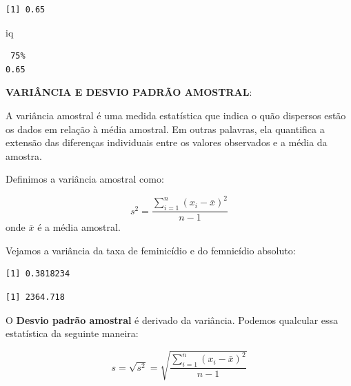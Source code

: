 \documentclass[
  letterpaper,
  DIV=11,
  numbers=noendperiod]{scrreprt}
\newenvironment{Shaded}{\begin{snugshade}}{\end{snugshade}}
\newcommand{\AttributeTok}[1]{\textcolor[rgb]{0.40,0.45,0.13}{#1}}
\newcommand{\FunctionTok}[1]{\textcolor[rgb]{0.28,0.35,0.67}{#1}}
\newcommand{\NormalTok}[1]{\textcolor[rgb]{0.00,0.23,0.31}{#1}}
\newcommand{\SpecialCharTok}[1]{\textcolor[rgb]{0.37,0.37,0.37}{#1}}
\begin{document}
\begin{verbatim}
[1] 0.65
\end{verbatim}

\begin{Shaded}
\begin{Highlighting}[]
\NormalTok{iq}
\end{Highlighting}
\end{Shaded}

\begin{verbatim}
 75% 
0.65 
\end{verbatim}

\textbf{VARIÂNCIA E DESVIO PADRÃO AMOSTRAL}:

A variância amostral é uma medida estatística que indica o quão
dispersos estão os dados em relação à média amostral. Em outras
palavras, ela quantifica a extensão das diferenças individuais entre os
valores observados e a média da amostra.

Definimos a variância amostral como:

\[s^2 = \frac{\sum_{i=1}^{n} (x_i - \bar{x})^2}{n-1}\] onde \(\bar{x}\)
é a média amostral.

Vejamos a variância da taxa de feminicídio e do femnicídio absoluto:

\begin{Shaded}
\end{Shaded}

\begin{verbatim}
[1] 0.3818234
\end{verbatim}

\begin{Shaded}
\end{Shaded}

\begin{verbatim}
[1] 2364.718
\end{verbatim}

O \textbf{Desvio padrão amostral} é derivado da variância. Podemos
qualcular essa estatística da seguinte maneira:

\[s = \sqrt{s^2} = \sqrt{\frac{\sum_{i=1}^{n} (x_i - \bar{x})^2}{n-1}}\]
\end{document}
